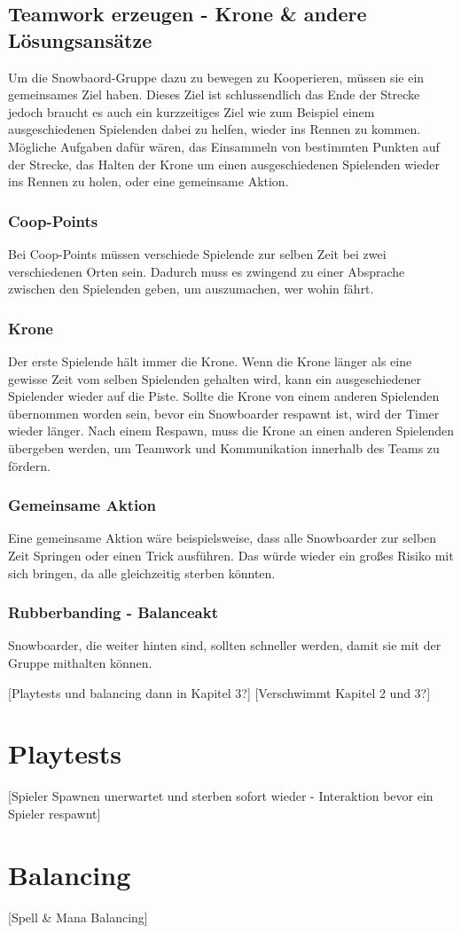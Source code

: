\subsection{Teamwork erzeugen - Krone \& andere Lösungsansätze\label{_teamwork_erzeugen}}
Um die Snowbaord-Gruppe dazu zu bewegen zu Kooperieren, müssen sie ein gemeinsames Ziel haben. Dieses Ziel ist schlussendlich das Ende der Strecke jedoch braucht es auch ein kurzzeitiges Ziel wie zum Beispiel einem ausgeschiedenen Spielenden dabei zu helfen, wieder ins Rennen zu kommen. Mögliche Aufgaben dafür wären, das Einsammeln von bestimmten Punkten auf der Strecke, das Halten der Krone um einen ausgeschiedenen Spielenden wieder ins Rennen zu holen, oder eine gemeinsame Aktion.

\subsubsection{Coop-Points}
Bei Coop-Points müssen verschiede Spielende zur selben Zeit bei zwei verschiedenen Orten sein. Dadurch muss es zwingend zu einer Absprache zwischen den Spielenden geben, um auszumachen, wer wohin fährt.

\subsubsection{Krone}
Der erste Spielende hält immer die Krone. Wenn die Krone länger als eine gewisse Zeit vom selben Spielenden gehalten wird, kann ein ausgeschiedener Spielender wieder auf die Piste. Sollte die Krone von einem anderen Spielenden übernommen worden sein, bevor ein Snowboarder respawnt ist, wird der Timer wieder länger. Nach einem Respawn, muss die Krone an einen anderen Spielenden übergeben werden, um Teamwork und Kommunikation innerhalb des Teams zu fördern.

\subsubsection{Gemeinsame Aktion}
Eine gemeinsame Aktion wäre beispielsweise, dass alle Snowboarder zur selben Zeit Springen oder einen Trick ausführen. Das würde wieder ein großes Risiko mit sich bringen, da alle gleichzeitig sterben könnten.

\subsubsection{Rubberbanding - Balanceakt}
Snowboarder, die weiter hinten sind, sollten schneller werden, damit sie mit der Gruppe mithalten können. 

[Playtests und balancing dann in Kapitel 3?]
[Verschwimmt Kapitel 2 und 3?]

\section{Playtests}

[Spieler Spawnen unerwartet und sterben sofort wieder - Interaktion bevor ein Spieler respawnt]

\section{Balancing}

[Spell \& Mana Balancing]
